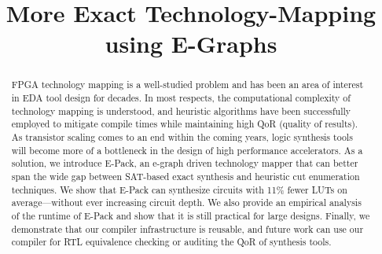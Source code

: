 \documentclass[sigplan,nonacm]{acmart}
\newcommand{\fullname}{More Exact Technology-Mapping using E-Graphs}
\newcommand{\metric}{11\% fewer LUTs}
\begin{document}
\title{\fullname}

\begin{abstract}
    FPGA technology mapping is a well-studied problem and has been an area of
    interest in EDA tool design for decades. In most respects, the computational
    complexity of technology mapping is understood, and heuristic algorithms have
    been successfully employed to mitigate compile times while maintaining high QoR
    (quality of results). As transistor scaling comes to an end within the coming
    years, logic synthesis tools will become more of a bottleneck in the design of
    high performance accelerators. As a solution, we introduce E-Pack, an e-graph
    driven technology mapper that can better span the wide gap between SAT-based
    exact synthesis and heuristic cut enumeration techniques. We show that E-Pack
    can synthesize circuits with \metric{} on average---without ever
    increasing circuit depth. We also provide an empirical analysis of the runtime
    of E-Pack and show that it is still practical for large designs. Finally, we
    demonstrate that our compiler infrastructure is reusable, and future work can
    use our compiler for RTL equivalence checking or auditing the QoR of synthesis
    tools.
\end{abstract}
\maketitle %













\end{document}
